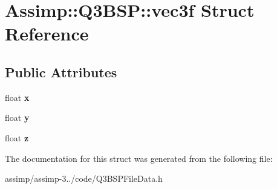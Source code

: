 \hypertarget{struct_assimp_1_1_q3_b_s_p_1_1vec3f}{\section{Assimp\+:\+:Q3\+B\+S\+P\+:\+:vec3f Struct Reference}
\label{struct_assimp_1_1_q3_b_s_p_1_1vec3f}
}
\subsection*{Public Attributes}
\begin{DoxyCompactItemize}
\item 
\hypertarget{struct_assimp_1_1_q3_b_s_p_1_1vec3f_a6460811652e92d3557cea1773f25294f}{float {\bfseries x}}\label{struct_assimp_1_1_q3_b_s_p_1_1vec3f_a6460811652e92d3557cea1773f25294f}

\item 
\hypertarget{struct_assimp_1_1_q3_b_s_p_1_1vec3f_acfe39bbe8db59bdc871b9175b238b5f4}{float {\bfseries y}}\label{struct_assimp_1_1_q3_b_s_p_1_1vec3f_acfe39bbe8db59bdc871b9175b238b5f4}

\item 
\hypertarget{struct_assimp_1_1_q3_b_s_p_1_1vec3f_aeb9b824a4c3604063535d35a81ced985}{float {\bfseries z}}\label{struct_assimp_1_1_q3_b_s_p_1_1vec3f_aeb9b824a4c3604063535d35a81ced985}

\end{DoxyCompactItemize}


The documentation for this struct was generated from the following file\+:\begin{DoxyCompactItemize}
\item 
assimp/assimp-\/3../code/Q3\+B\+S\+P\+File\+Data.\+h\end{DoxyCompactItemize}
